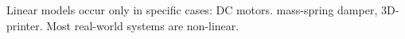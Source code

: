 Linear models occur only in specific cases: DC motors. mass-spring damper, 3D-printer.
Most real-world systems are non-linear. 